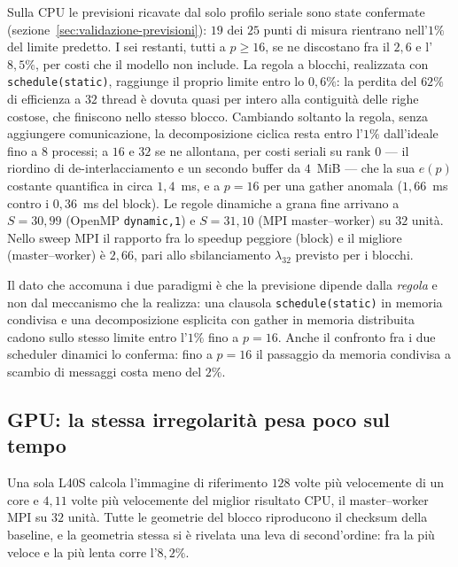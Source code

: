 Sulla CPU le previsioni ricavate dal solo profilo seriale sono state confermate
(sezione~\ref{sec:validazione-previsioni}): $19$ dei $25$ punti di misura
rientrano nell'$1\%$ del limite predetto. I sei restanti, tutti a $p \ge 16$, se
ne discostano fra il $2{,}6$ e l'$8{,}5\%$, per costi che il modello non include.
La regola a blocchi, realizzata con \texttt{schedule(static)}, raggiunge il
proprio limite entro lo $0{,}6\%$: la perdita del $62\%$ di efficienza a $32$
thread è dovuta quasi per intero alla contiguità delle righe costose, che
finiscono nello stesso blocco. Cambiando soltanto la regola, senza aggiungere
comunicazione, la decomposizione ciclica resta entro l'$1\%$ dall'ideale fino a
$8$ processi; a $16$ e $32$ se ne allontana, per costi seriali su rank $0$ ---
il riordino di de-interlacciamento e un secondo buffer da $4$~MiB --- che la sua
$e(p)$ costante quantifica in circa $1{,}4$~ms, e a $p=16$ per una gather anomala
($1{,}66$~ms contro i $0{,}36$~ms del block).
Le regole dinamiche a grana fine arrivano a $S = 30{,}99$ (OpenMP
\texttt{dynamic,1}) e $S = 31{,}10$ (MPI master--worker) su $32$ unità. Nello
sweep MPI il rapporto fra lo speedup peggiore (block) e il migliore
(master--worker) è $2{,}66$, pari allo sbilanciamento $\lambda_{32}$ previsto per
i blocchi.

Il dato che accomuna i due paradigmi è che la previsione dipende dalla
\emph{regola} e non dal meccanismo che la realizza: una clausola
\texttt{schedule(static)} in memoria condivisa e una decomposizione esplicita con
gather in memoria distribuita cadono sullo stesso limite entro l'$1\%$ fino a
$p = 16$. Anche il confronto fra i due scheduler dinamici lo conferma: fino a
$p = 16$ il passaggio da memoria condivisa a scambio di messaggi costa meno del
$2\%$.

\subsection{GPU: la stessa irregolarità pesa poco sul tempo}

Una sola L40S calcola l'immagine di riferimento $128$ volte più velocemente di un
core e $4{,}11$ volte più velocemente del miglior risultato CPU, il master--worker
MPI su $32$ unità. Tutte le geometrie del blocco riproducono il checksum della
baseline, e la geometria stessa si è rivelata una leva di second'ordine: fra la
più veloce e la più lenta corre l'$8{,}2\%$.

